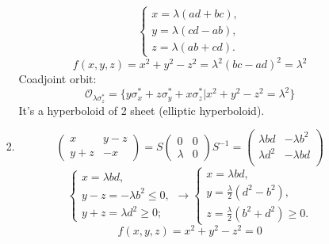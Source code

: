 \documentclass[12pt]{article}
\theoremstyle{definition}
\begin{document}
\begin{enumerate}
\begin{itemize}
\begin{enumerate}
\begin{equation}
\begin{cases}
            x=\lambda(ad+bc),\\
            y=\lambda(cd-ab),\\
            z=\lambda(ab+cd).
        \end{cases}
    \end{equation}
    \begin{equation}
        f(x,y,z)=x^2+y^2-z^2=\lambda^2(bc-ad)^2=\lambda^2
    \end{equation}
    Coadjoint orbit:
    \begin{equation}
        \mathcal{O}_{\lambda\sigma^*_z}=\{y\sigma^*_x+z\sigma^*_y+x\sigma^*_z|x^2+y^2-z^2=\lambda^2\}
    \end{equation}
    It's a hyperboloid of 2 sheet (elliptic hyperboloid).
    \item 
        \begin{equation}
            \begin{pmatrix}
            x & y-z \\
            y+z & -x
        \end{pmatrix}=
        S \begin{pmatrix}
            0 & 0 \\
            \lambda & 0
        \end{pmatrix}  S^{-1}= 
        \begin{pmatrix}
            \lambda bd & -\lambda b^2\\
            \lambda d^2 & -\lambda bd \\
        \end{pmatrix}
        \end{equation}
        \begin{equation}
            \begin{cases}
                x=\lambda bd,\\
                y-z=-\lambda b^2\leq0,\\
                y+z=\lambda d^2\geq0;
            \end{cases}\rightarrow\begin{cases}
                x=\lambda bd,\\
                y=\frac{\lambda}{2}(d^2-b^2),\\
                z=\frac{\lambda}{2}(b^2+d^2)\geq0.
            \end{cases}
        \end{equation}
        \begin{equation}
            f(x,y,z)=x^2+y^2-z^2=0
        \end{equation}

\end{enumerate}
\end{itemize}
\end{enumerate}
\end{document}

